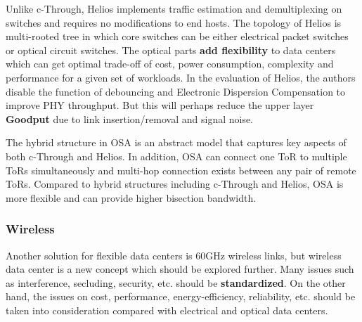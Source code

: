 \documentclass[journal,onecolumn,11pt]{IEEEtran}
\begin{document}
Unlike c-Through, Helios implements traffic estimation and demultiplexing on switches and requires no modifications to end hosts. The topology of Helios is multi-rooted tree in which core switches can be either electrical packet switches or optical circuit switches. The optical parts \textbf{add flexibility} to data centers which can get optimal trade-off of cost, power consumption, complexity and performance for a given set of workloads. In the evaluation of Helios, the authors disable the function of debouncing and Electronic Dispersion Compensation to improve PHY throughput. But this will perhaps reduce the upper layer \textbf{Goodput} due to link insertion/removal and signal noise.


The hybrid structure in OSA is an abstract model that captures key aspects of both c-Through and Helios. In addition, OSA can connect one ToR to multiple ToRs simultaneously and multi-hop connection exists between any pair of remote ToRs. Compared to hybrid structures including c-Through and Helios, OSA is more flexible and can provide higher bisection bandwidth.

\subsubsection{Wireless}

Another solution for flexible data centers is 60GHz wireless links, but wireless data center is a new concept which should be explored further. Many issues such as interference, secluding, security, etc. should be \textbf{standardized}. On the other hand, the issues on cost, performance, energy-efficiency, reliability, etc. should be taken into consideration compared with electrical and optical data centers.


\end{document}
